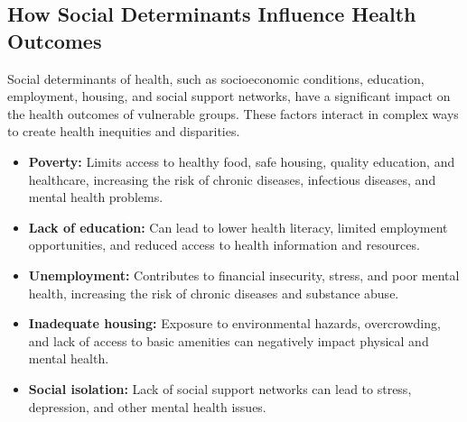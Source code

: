 \documentclass[12pt,a4paper]{article}
\begin{document}
\subsection*{How Social Determinants Influence Health Outcomes}
Social determinants of health, such as socioeconomic conditions, education, employment, housing, and social support networks, have a significant impact on the health outcomes of vulnerable groups. These factors interact in complex ways to create health inequities and disparities.
\begin{itemize}
    \item \textbf{Poverty:} Limits access to healthy food, safe housing, quality education, and healthcare, increasing the risk of chronic diseases, infectious diseases, and mental health problems.
    \item \textbf{Lack of education:} Can lead to lower health literacy, limited employment opportunities, and reduced access to health information and resources.
    \item \textbf{Unemployment:} Contributes to financial insecurity, stress, and poor mental health, increasing the risk of chronic diseases and substance abuse.
    \item \textbf{Inadequate housing:} Exposure to environmental hazards, overcrowding, and lack of access to basic amenities can negatively impact physical and mental health.
    \item \textbf{Social isolation:} Lack of social support networks can lead to stress, depression, and other mental health issues.
\end{itemize}
\end{document}
